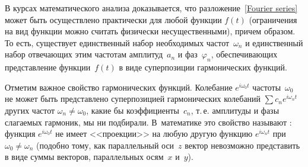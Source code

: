 В курсах математического анализа доказывается, что
разложение~\eqref{Fourier series} может быть осуществлено 
практически для любой функции $f(t)$
(ограничения на вид функции можно считать физически несущественными), 
причем  образом.
То есть, существует единственный набор необходимых частот~$\omega_n$ и
единственный набор отвечающих этим частотам амплитуд~$a_n$ и фаз~$\varphi_n$,
обеспечивающих представление функции~$f(t)$ в виде суперпозиции гармонических
функций. 

\begin{lab:note}
Отметим важное свойство гармонических функций.
Колебание $e^{i\omega_0 t}$ частоты~$\omega_0$ не может быть
представлено суперпозицией гармонических колебаний $\sum c_n e^{i\omega_n t}$
других частот $\omega_n\ne\omega_0$, какие бы коэффициенты~$c_n$, т.\,е.
амплитуды и фазы слагаемых гармоник, мы ни подбирали. В~математике это
свойство называют : функция $e^{i\omega_0 t}$
не имеет <<проекции>> на любую другую функцию $e^{i\omega_nt}$ при
$\omega_0\ne\omega_n$ (подобно тому, как параллельный оси~$z$ вектор
невозможно представить в виде суммы векторов, параллельных осям~$x$ и~$y$).
\end{lab:note}

